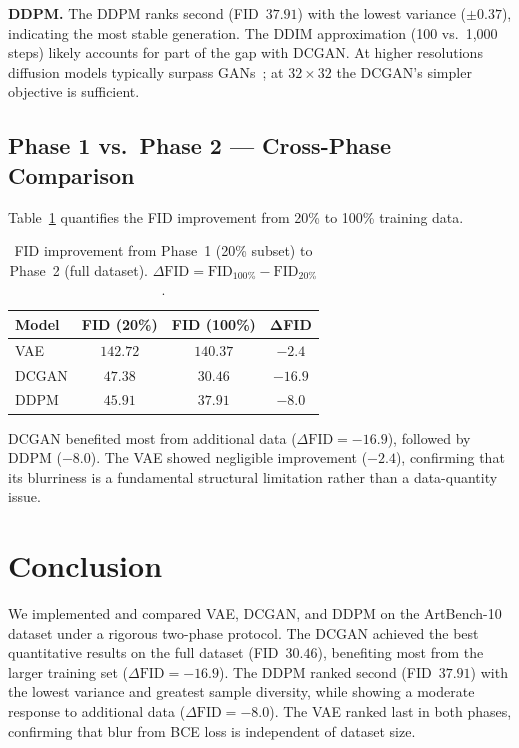 \documentclass{llncs}
\begin{document}
\textbf{DDPM.} The DDPM ranks second (FID~$37.91$) with the lowest variance
($\pm0.37$), indicating the most stable generation. The DDIM approximation
(100 vs.\ 1,000 steps) likely accounts for part of the gap with DCGAN.
At higher resolutions diffusion models typically surpass GANs~\cite{dhariwal2021};
at $32\times32$ the DCGAN's simpler objective is sufficient.

\subsection{Phase 1 vs.\ Phase 2 --- Cross-Phase Comparison}

Table~\ref{tab:comparison} quantifies the FID improvement from 20\% to
100\% training data.

\begin{table}[H]
\centering
\caption{FID improvement from Phase~1 (20\% subset) to Phase~2 (full
         dataset). $\Delta\text{FID}=\text{FID}_{100\%}-\text{FID}_{20\%}$.}
\label{tab:comparison}
\begin{tabular}{lccc}
\toprule
\textbf{Model} & \textbf{FID (20\%)} & \textbf{FID (100\%)}
               & $\boldsymbol{\Delta}$\textbf{FID} \\
\midrule
VAE   & $142.72$ & $140.37$ & $-2.4$ \\
DCGAN & $47.38$  & $30.46$  & $-16.9$ \\
DDPM  & $45.91$  & $37.91$  & $-8.0$ \\
\bottomrule
\end{tabular}
\end{table}

DCGAN benefited most from additional data ($\Delta\text{FID}=-16.9$),
followed by DDPM ($-8.0$). The VAE showed negligible improvement ($-2.4$),
confirming that its blurriness is a fundamental structural limitation rather
than a data-quantity issue.

\section{Conclusion}
\label{sec:conclusion}

We implemented and compared VAE, DCGAN, and DDPM on the ArtBench-10 dataset
under a rigorous two-phase protocol. The DCGAN achieved the best quantitative
results on the full dataset (FID~$30.46$), benefiting most from the larger
training set ($\Delta\text{FID}=-16.9$). The DDPM ranked second
(FID~$37.91$) with the lowest variance and greatest sample diversity,
while showing a moderate response to additional data ($\Delta\text{FID}=-8.0$).
The VAE ranked last in both phases, confirming that blur from BCE loss is
independent of dataset size.
\end{document}
